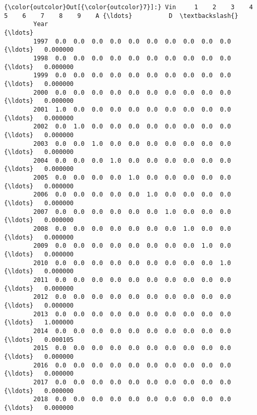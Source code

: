 \documentclass[11pt]{article}
\begin{document}
\begin{Verbatim}[commandchars=\\\{\}]
{\color{outcolor}Out[{\color{outcolor}7}]:} Vin     1    2    3    4    5    6    7    8    9    A {\ldots}          D  \textbackslash{}
        Year                                                   {\ldots}              
        1997  0.0  0.0  0.0  0.0  0.0  0.0  0.0  0.0  0.0  0.0 {\ldots}   0.000000   
        1998  0.0  0.0  0.0  0.0  0.0  0.0  0.0  0.0  0.0  0.0 {\ldots}   0.000000   
        1999  0.0  0.0  0.0  0.0  0.0  0.0  0.0  0.0  0.0  0.0 {\ldots}   0.000000   
        2000  0.0  0.0  0.0  0.0  0.0  0.0  0.0  0.0  0.0  0.0 {\ldots}   0.000000   
        2001  1.0  0.0  0.0  0.0  0.0  0.0  0.0  0.0  0.0  0.0 {\ldots}   0.000000   
        2002  0.0  1.0  0.0  0.0  0.0  0.0  0.0  0.0  0.0  0.0 {\ldots}   0.000000   
        2003  0.0  0.0  1.0  0.0  0.0  0.0  0.0  0.0  0.0  0.0 {\ldots}   0.000000   
        2004  0.0  0.0  0.0  1.0  0.0  0.0  0.0  0.0  0.0  0.0 {\ldots}   0.000000   
        2005  0.0  0.0  0.0  0.0  1.0  0.0  0.0  0.0  0.0  0.0 {\ldots}   0.000000   
        2006  0.0  0.0  0.0  0.0  0.0  1.0  0.0  0.0  0.0  0.0 {\ldots}   0.000000   
        2007  0.0  0.0  0.0  0.0  0.0  0.0  1.0  0.0  0.0  0.0 {\ldots}   0.000000   
        2008  0.0  0.0  0.0  0.0  0.0  0.0  0.0  1.0  0.0  0.0 {\ldots}   0.000000   
        2009  0.0  0.0  0.0  0.0  0.0  0.0  0.0  0.0  1.0  0.0 {\ldots}   0.000000   
        2010  0.0  0.0  0.0  0.0  0.0  0.0  0.0  0.0  0.0  1.0 {\ldots}   0.000000   
        2011  0.0  0.0  0.0  0.0  0.0  0.0  0.0  0.0  0.0  0.0 {\ldots}   0.000000   
        2012  0.0  0.0  0.0  0.0  0.0  0.0  0.0  0.0  0.0  0.0 {\ldots}   0.000000   
        2013  0.0  0.0  0.0  0.0  0.0  0.0  0.0  0.0  0.0  0.0 {\ldots}   1.000000   
        2014  0.0  0.0  0.0  0.0  0.0  0.0  0.0  0.0  0.0  0.0 {\ldots}   0.000105   
        2015  0.0  0.0  0.0  0.0  0.0  0.0  0.0  0.0  0.0  0.0 {\ldots}   0.000000   
        2016  0.0  0.0  0.0  0.0  0.0  0.0  0.0  0.0  0.0  0.0 {\ldots}   0.000000   
        2017  0.0  0.0  0.0  0.0  0.0  0.0  0.0  0.0  0.0  0.0 {\ldots}   0.000000   
        2018  0.0  0.0  0.0  0.0  0.0  0.0  0.0  0.0  0.0  0.0 {\ldots}   0.000000   
        

\end{Verbatim}
\end{document}
